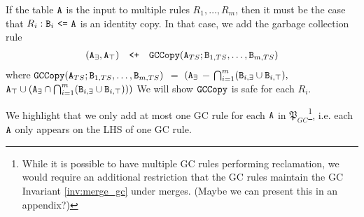 If the table $\tt{A}$ is the input to multiple rules $R_1, \dots, R_m$, then it must be the case that $R_i: \tt{B}_i ~\tt{<=}~ \tt{A}$ is an identity copy.
In that case, we add the garbage collection rule
\begin{align}
(\tt{A}_\exists, \tt{A}_\top) \quad\tt{<+}\quad \tt{GCCopy}(\tt{A}_{TS}; \tt{B}_{1,TS}, \dots, \tt{B}_{m,TS})
\end{align}
where $\tt{GCCopy}(\tt{A}_{TS}; \tt{B}_{1,TS}, \dots, \tt{B}_{m,TS})$ $=$ $(\tt{A}_\exists$ $-$ $\bigcap_{i=1}^m (\tt{B}_{i,\exists} \cup \tt{B}_{i,\top}),$ $\tt{A}_\top \cup (\tt{A}_\exists \cap \bigcap_{i=1}^m (\tt{B}_{i,\exists} \cup \tt{B}_{i,\top})))$
We will show $\tt{GCCopy}$ is safe for each $R_i$.

We highlight that we only add at most one GC rule for each $\tt{A}$ in $\mathfrak{P}_{GC}$\footnote{
While it is possible to have multiple GC rules performing reclamation, we would require an additional restriction that the GC rules maintain the GC Invariant \ref{inv:merge_gc} under merges.
(Maybe we can present this in an appendix?)
}, i.e. each $\tt{A}$ only appears on the LHS of one GC rule.


